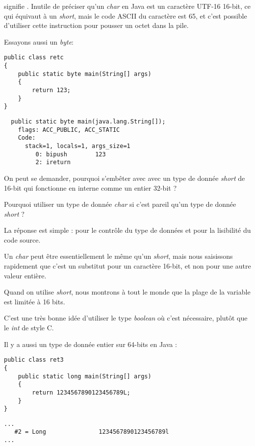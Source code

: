 signifie .
Inutile de préciser qu'un \emph{char} en Java est un caractère UTF-16 16-bit, 
ce qui équivaut à un \emph{short}, mais le code ASCII du caractère  est 65, et c'est possible
d'utiliser cette instruction pour pousser un octet dans la pile.

Essayons aussi un \emph{byte}:

\begin{lstlisting}[style=customjava]
public class retc
{
	public static byte main(String[] args) 
	{
		return 123;
	}
}
\end{lstlisting}

\begin{lstlisting}
  public static byte main(java.lang.String[]);
    flags: ACC_PUBLIC, ACC_STATIC
    Code:
      stack=1, locals=1, args_size=1
         0: bipush        123
         2: ireturn       
\end{lstlisting}

On peut se demander, pourquoi s'embêter avec avec un type de donnée \emph{short} de 16-bit qui fonctionne en interne
comme un entier 32-bit ?

Pourquoi utiliser un type de donnée \emph{char} si c'est pareil qu'un type de donnée \emph{short} ?

La réponse est simple : pour le contrôle du type de données et pour la lisibilité du code source.

Un \emph{char} peut être essentiellement le même qu'un \emph{short}, mais nous saisissons rapidement que c'est un substitut pour 
un caractère 16-bit, et non pour une autre valeur entière.

Quand on utilise \emph{short}, nous montrons à tout le monde que la plage de la variable est limitée à 16 bits.

C'est une très bonne idée d'utiliser le type \emph{boolean} où c'est nécessaire, 
plutôt que le \emph{int} de style C.

Il y a aussi un type de donnée entier sur 64-bits en Java :

\begin{lstlisting}[style=customjava]
public class ret3
{
	public static long main(String[] args)
	{
		return 1234567890123456789L;
	}
}
\end{lstlisting}

\begin{lstlisting}[caption=Constant pool]
...
   #2 = Long               1234567890123456789l
...
\end{lstlisting}

